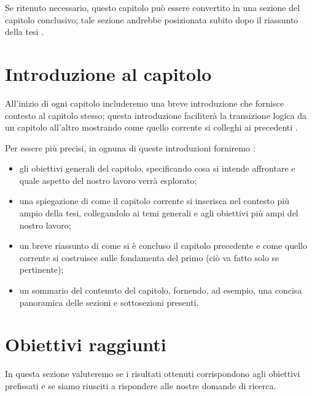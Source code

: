 \medskip

Se ritenuto necessario, questo capitolo può essere convertito in una sezione del capitolo conclusivo; tale sezione andrebbe posizionata subito dopo il riassunto della tesi \cite{zobel2015writing}.

\section{Introduzione al capitolo}

All'inizio di ogni capitolo includeremo una breve introduzione che fornisce contesto al capitolo stesso; questa introduzione faciliterà la transizione logica da un capitolo all'altro mostrando come quello corrente si colleghi ai precedenti \cite{zobel2015writing}.

\medskip

Per essere più precisi, in ognuna di queste introduzioni forniremo \cite{unibz2022thesis}:
\begin{itemize}

\item gli obiettivi generali del capitolo, specificando cosa si intende affrontare e quale aspetto del nostro lavoro verrà esplorato;

\item una spiegazione di come il capitolo corrente si inserisca nel contesto più ampio della tesi, collegandolo ai temi generali e agli obiettivi più ampi del nostro lavoro;

\item un breve riassunto di come si è concluso il capitolo precedente e come quello corrente si costruisce sulle fondamenta del primo (ciò va fatto solo se pertinente);

\item un sommario del contenuto del capitolo, fornendo, ad esempio, una concisa panoramica delle sezioni e sottosezioni presenti.

\end{itemize}

\section{Obiettivi raggiunti}

In questa sezione valuteremo se i risultati ottenuti corrispondono agli obiettivi prefissati e se siamo riusciti a rispondere alle nostre domande di ricerca. 

